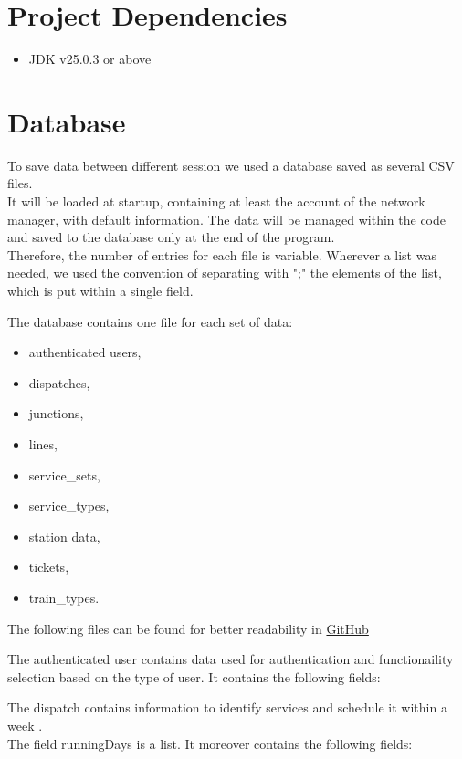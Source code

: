 \section{Project Dependencies}
\begin{itemize}
    \item JDK v25.0.3 or above
\end{itemize}

\section{Database}

To save data between different session we used a database saved as several CSV files.\\
It will be loaded at startup, containing at least the account of the network manager, with default information.
The data will be managed within the code and saved to the database only at the end of the program.\\
Therefore, the number of entries for each file is variable. Wherever a list was needed, we used the convention of separating with ";" the elements of the list, which is put within a single field.

The database contains one file for each set of data:
\begin{itemize}
    \item authenticated users,
    \item dispatches,
    \item junctions,
    \item lines,
    \item service\_sets,
    \item service\_types,
    \item station data,
    \item tickets,
    \item train\_types.
\end{itemize}

The following files can be found for better readability in \href{https://github.com/DispatchNet/TRE/tree/userD/D3_DispatchNet/code/src/csv_database/data}{GitHub}

The authenticated user contains data used for authentication and functionaility selection based on the type of user. It contains the following fields:

The dispatch contains information to identify services and schedule it within a week .\\
The field runningDays is a list. It moreover contains the following fields: 

